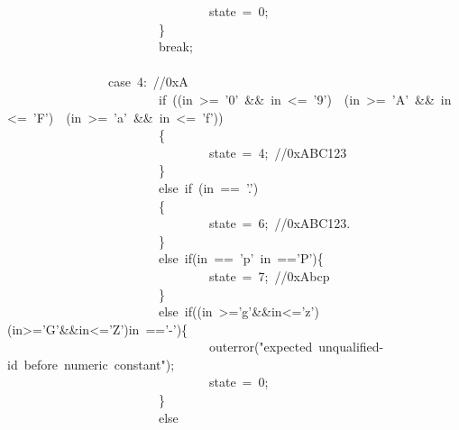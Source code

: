 \documentclass{article}
\begin{document}
\begin{mdpre}
~~~~~~~~~~~~~~~~~~~~~~~~~~~~~~~~state~=~{0};\\
~~~~~~~~~~~~~~~~~~~~~~~~\}\\
~~~~~~~~~~~~~~~~~~~~~~~~{break};\\
\\
~~~~~~~~~~~~~~~~{case}~{4}:~{//0xA}\\
~~~~~~~~~~~~~~~~~~~~~~~~{if}~((in~\textgreater{}=~{'0'}~\&\&~in~\textless{}=~{'9'})~\textbar{}\textbar{}~(in~\textgreater{}=~{'A'}~\&\&~in~\textless{}=~{'F'})~\textbar{}\textbar{}~(in~\textgreater{}=~{'a'}~\&\&~in~\textless{}=~{'f'}))\\
~~~~~~~~~~~~~~~~~~~~~~~~\{\\
~~~~~~~~~~~~~~~~~~~~~~~~~~~~~~~~state~=~{4};~{//0xABC123}\\
~~~~~~~~~~~~~~~~~~~~~~~~\}\\
~~~~~~~~~~~~~~~~~~~~~~~~{else}~{if}~(in~==~{'.'})\\
~~~~~~~~~~~~~~~~~~~~~~~~\{\\
~~~~~~~~~~~~~~~~~~~~~~~~~~~~~~~~state~=~{6};~{//0xABC123.}\\
~~~~~~~~~~~~~~~~~~~~~~~~\}\\
~~~~~~~~~~~~~~~~~~~~~~~~{else}~{if}(in~==~{'p'}\textbar{}\textbar{}~in~=={'P'})\{\\
~~~~~~~~~~~~~~~~~~~~~~~~~~~~~~~~state~=~{7};~{//0xAbcp}\\
~~~~~~~~~~~~~~~~~~~~~~~~\}\\
~~~~~~~~~~~~~~~~~~~~~~~~{else}~{if}((in~\textgreater{}={'g'}\&\&in\textless{}={'z'})\textbar{}\textbar{}(in\textgreater{}={'G'}\&\&in\textless{}={'Z'})\textbar{}\textbar{}in~=={'-'})\{\\
~~~~~~~~~~~~~~~~~~~~~~~~~~~~~~~~outerror({"}{expected~unqualified-id~before~numeric~constant}{"});\\
~~~~~~~~~~~~~~~~~~~~~~~~~~~~~~~~state~=~{0};\\
~~~~~~~~~~~~~~~~~~~~~~~~\}\\
~~~~~~~~~~~~~~~~~~~~~~~~{else}\\

\end{mdpre}
\end{document}
